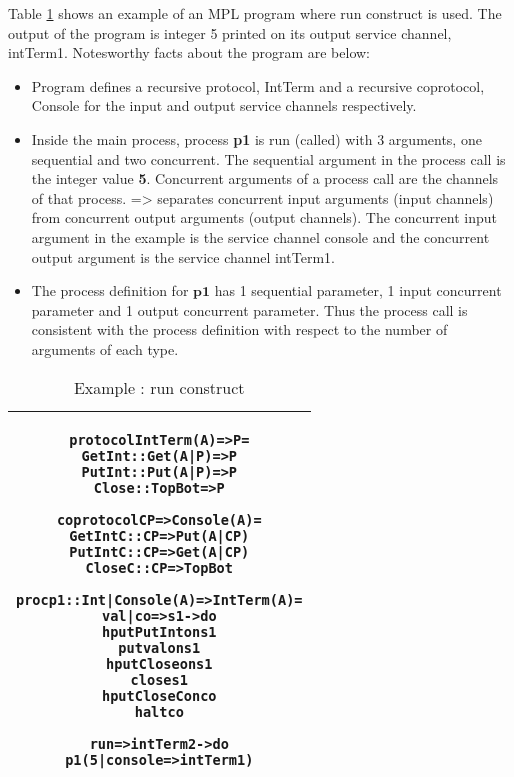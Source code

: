 \documentclass[11pt]{article}
\newcommand{\<}{\langle}
\renewcommand{\>}{\rangle}
\begin{document}
Table \ref {Conc : runExample} shows an example of an MPL program where {\sf run} construct is used. The output of the program is integer 5 printed on its output service channel, intTerm1. Notesworthy facts about the program are below:

\begin{itemize}
  \item Program defines a recursive protocol, IntTerm and a recursive coprotocol, Console for the input and output service channels respectively.

  \item Inside the main process, process {\bf p1} is {\sf run} (called) with 3 arguments, one sequential and two concurrent. The sequential argument in the process call is the integer value {\bf 5}. Concurrent arguments of a process call are the channels of that process. $\texttt{=>}$ separates concurrent input arguments (input channels) from concurrent output arguments (output channels). The concurrent input argument in the example is the service channel console and the concurrent output argument is the service channel intTerm1. 
  \item The process definition for $\mathbf{p1}$ has 1 sequential parameter, 1 input concurrent parameter and 1 output concurrent parameter. Thus the process call is consistent with the process definition with respect to the number of arguments of each type. 
\end{itemize}
\begin{table}[h!]
\begin{center}
\begin{tabular}{|c|} \hline
\begin{minipage}{5in}
{
\begin{alltt}


    protocol IntTerm (A) => P =
        GetInt    :: Get (A|P) => P 
        PutInt    :: Put (A|P) => P
        Close     :: TopBot    => P  

    coprotocol CP => Console (A) =
        GetIntC   :: CP => Put (A|CP)  
        PutIntC   :: CP => Get (A|CP) 
        CloseC    :: CP => TopBot 

    proc p1 :: Int | Console (A) => IntTerm (A) = 
        val | co => s1 -> do 
            hput PutInt on s1 
            put val on s1
            hput Close on s1 
            close s1
            hput CloseC on co
            halt co

    run => intTerm2 -> do 
          p1 ( 5 | console => intTerm1 )

\end{alltt}

} 
\end {minipage} 
\tabularnewline
\hline
\end{tabular}
\caption{Example : {\sf run} construct}
\label{Conc : runExample}
\end{center}
\end{table}
\end{document}
